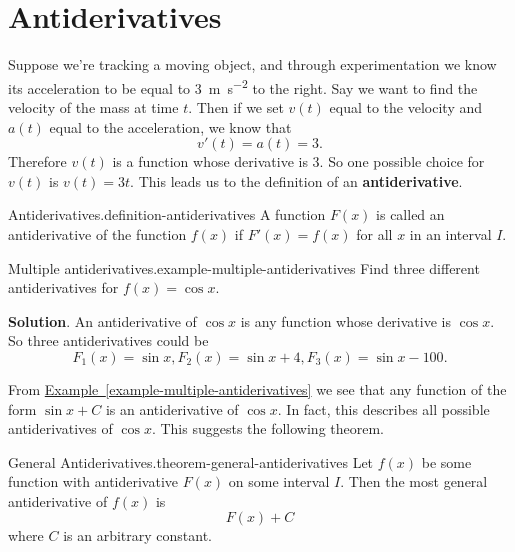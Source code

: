 \documentclass[10pt,]{book}
\newcommand{\terminology}[1]{\textbf{#1}}
\numberwithin{equation}{section}
\begin{document}
\section[{Antiderivatives}]{Antiderivatives}\label{section-antiderivatives}
\hypertarget{p-377}{}%
Suppose we're tracking a moving object, and through experimentation we know its acceleration to be equal to \SI{3}{\meter\per\second\tothe{2}} to the right. Say we want to find the velocity of the mass at time \(t\). Then if we set \(v(t)\) equal to the velocity and \(a(t)\) equal to the acceleration, we know that%
\begin{equation*}
v'(t) = a(t) = 3.
\end{equation*}
Therefore \(v(t)\) is a function whose derivative is \(3\). So one possible choice for \(v(t)\) is \(v(t) = 3t\). This leads us to the definition of an \terminology{antiderivative}.%
\begin{definition}{Antiderivatives.}{definition-antiderivatives}%
\hypertarget{p-378}{}%
A function \(F(x)\) is called an antiderivative of the function \(f(x)\) if \(F'(x) = f(x)\) for all \(x\) in an interval \(I\).%
\end{definition}
\begin{example}{Multiple antiderivatives.}{example-multiple-antiderivatives}%
\hypertarget{p-379}{}%
Find three different antiderivatives for \(f(x) = \cos x\).%
\par\smallskip%
\noindent\textbf{Solution}.\hypertarget{solution-84}{}\quad%
\hypertarget{p-380}{}%
An antiderivative of \(\cos x\) is any function whose derivative is \(\cos x\). So three antiderivatives could be%
\begin{equation*}
F_{1}(x) = \sin x, F_{2}(x) = \sin x + 4, F_{3}(x) = \sin x - 100.
\end{equation*}
%
\end{example}
\hypertarget{p-381}{}%
From \hyperref[example-multiple-antiderivatives]{Example~\ref{example-multiple-antiderivatives}} we see that any function of the form \(\sin x +C\) is an antiderivative of \(\cos x\). In fact, this describes all possible antiderivatives of \(\cos x\). This suggests the following theorem.%
\begin{theorem}{General Antiderivatives.}{}{theorem-general-antiderivatives}%
\hypertarget{p-382}{}%
Let \(f(x)\) be some function with antiderivative \(F(x)\) on some interval \(I\). Then the most general antiderivative of \(f(x)\) is%
\begin{equation*}
F(x) + C
\end{equation*}
where \(C\) is an arbitrary constant.%
\end{theorem}
\end{document}
